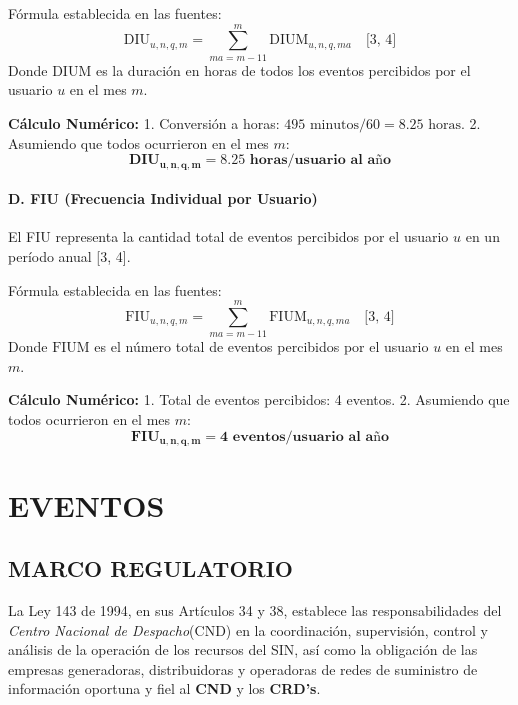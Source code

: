 \documentclass[a5paper]{book}%
\begin{document}
    Fórmula establecida en las fuentes:
    $$\text{DIU}_{u,n,q,m} = \sum_{ma=m-11}^{m} \text{DIUM}_{u,n,q,ma} \quad \text{[3, 4]}$$
    Donde $\text{DIUM}$ es la duración en horas de todos los eventos percibidos por el usuario $u$ en el mes $m$.
    
    \textbf{Cálculo Numérico:}
    1. Conversión a horas: $495 \text{ minutos} / 60 = 8.25 \text{ horas}$.
    2. Asumiendo que todos ocurrieron en el mes $m$:
    $$\mathbf{\text{DIU}_{u,n,q,m} = 8.25 \text{ horas/usuario al año}}$$
    
    \subsubsection*{D. FIU (Frecuencia Individual por Usuario)}
    
    El FIU representa la cantidad total de eventos percibidos por el usuario $u$ en un período anual [3, 4].
    
    Fórmula establecida en las fuentes:
    $$\text{FIU}_{u,n,q,m} = \sum_{ma=m-11}^{m} \text{FIUM}_{u,n,q,ma} \quad \text{[3, 4]}$$
    Donde $\text{FIUM}$ es el número total de eventos percibidos por el usuario $u$ en el mes $m$.
    
    \textbf{Cálculo Numérico:}
    1. Total de eventos percibidos: 4 eventos.
    2. Asumiendo que todos ocurrieron en el mes $m$:
   $$\mathbf{\text{FIU}_{u,n,q,m} = 4 \text{ eventos/usuario al año}}$$
    
    
  \chapter{EVENTOS}

\section{MARCO REGULATORIO}

\begin{center}
	\begin{tcolorbox}
		La Ley 143 de 1994, en sus Artículos 34 y 38, establece las responsabilidades del \textit{Centro Nacional de Despacho}(CND) en la coordinación, supervisión, control y análisis de la operación de los recursos del SIN, así como la obligación de las empresas generadoras, distribuidoras y operadoras de redes de suministro de información oportuna y fiel al \textbf{CND} y los \textbf{CRD's}.
	\end{tcolorbox}
\end{center}
\end{document}
